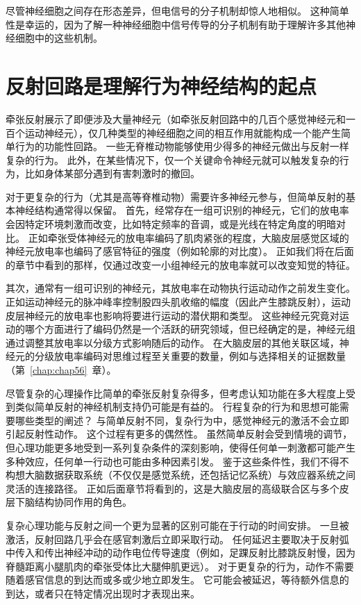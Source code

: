 尽管神经细胞之间存在形态差异，但电信号的分子机制却惊人地相似。 
这种简单性是幸运的，因为了解一种神经细胞中信号传导的分子机制有助于理解许多其他神经细胞中的这些机制。


\section{反射回路是理解行为神经结构的起点}
牵张反射展示了即便涉及大量神经元（如牵张反射回路中的几百个感觉神经元和一百个运动神经元），仅几种类型的神经细胞之间的相互作用就能构成一个能产生简单行为的功能性回路。
一些无脊椎动物能够使用少得多的神经元做出与反射一样复杂的行为。 
此外，在某些情况下，仅一个关键命令神经元就可以触发复杂的行为，比如身体某部分遇到有害刺激时的撤回。


对于更复杂的行为（尤其是高等脊椎动物）需要许多神经元参与，但简单反射的基本神经结构通常得以保留。
首先，经常存在一组可识别的神经元，它们的放电率会因特定环境刺激而改变，比如特定频率的音调，或是光线在特定角度的明暗对比。
正如牵张受体神经元的放电率编码了肌肉紧张的程度，大脑皮层感觉区域的神经元放电率也编码了感官特征的强度（例如轮廓的对比度）。 
正如我们将在后面的章节中看到的那样，仅通过改变一小组神经元的放电率就可以改变知觉的特征。


其次，通常有一组可识别的神经元，其放电率在动物执行运动动作之前发生变化。 
正如运动神经元的脉冲峰率控制股四头肌收缩的幅度（因此产生膝跳反射），运动皮层神经元的放电率也影响将要进行运动的潜伏期和类型。
这些神经元究竟对运动的哪个方面进行了编码仍然是一个活跃的研究领域，但已经确定的是，神经元组通过调整其放电率以分级方式影响随后的动作。 
在大脑皮层的其他关联区域，神经元的分级放电率编码对思维过程至关重要的数量，例如与选择相关的证据数量（第~\ref{chap:chap56}~章）。


尽管复杂的心理操作比简单的牵张反射复杂得多，但考虑认知功能在多大程度上受到类似简单反射的神经机制支持仍可能是有益的。 
行程复杂的行为和思想可能需要哪些类型的阐述？
与简单反射不同，复杂行为中，感觉神经元的激活不会立即引起反射性动作。
这个过程有更多的偶然性。 
虽然简单反射会受到情境的调节，但心理功能更多地受到一系列复杂条件的深刻影响，使得任何单一刺激都可能产生多种效应，任何单一行动也可能由多种因素引发。 
鉴于这些条件性，我们不得不构想大脑数据获取系统（不仅仅是感觉系统，还包括记忆系统）与效应器系统之间灵活的连接路径。
正如后面章节将看到的，这是大脑皮层的高级联合区与多个皮层下脑结构协同作用的角色。


复杂心理功能与反射之间一个更为显著的区别可能在于行动的时间安排。 
一旦被激活，反射回路几乎会在感官刺激后立即采取行动。 
任何延迟主要取决于反射弧中传入和传出神经冲动的动作电位传导速度（例如，足踝反射比膝跳反射慢，因为脊髓距离小腿肌肉的牵张受体比大腿伸肌更远）。
对于更复杂的行为，动作不需要随着感官信息的到达而或多或少地立即发生。 
它可能会被延迟，等待额外信息的到达，或者只在特定情况出现时才表现出来。


